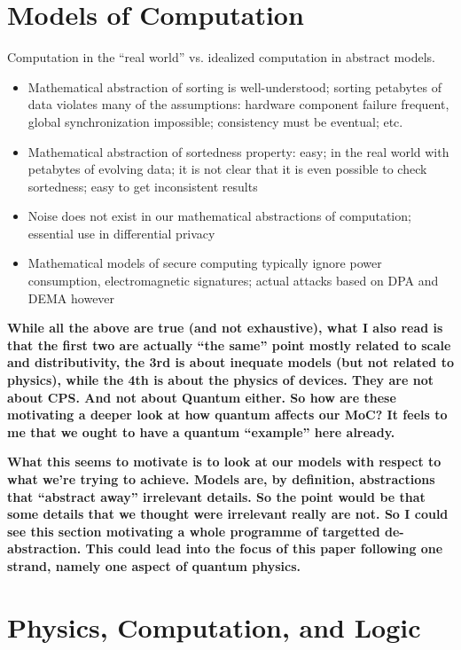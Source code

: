 \documentclass[12pt]{article}
\newcommand{\jc}[1]{\fbox{Jacques says:} \textbf{#1}}
\begin{document}
\section{Models of Computation}

Computation in the ``real world'' vs. idealized computation in
abstract models.
\begin{itemize}
\item Mathematical abstraction of sorting is well-understood; sorting
  petabytes of data violates many of the assumptions: hardware
  component failure frequent, global synchronization impossible;
  consistency must be eventual; etc.
\item Mathematical abstraction of sortedness property: easy; in the
  real world with petabytes of evolving data; it is not clear that it
  is even possible to check sortedness; easy to get inconsistent
  results
\item Noise does not exist in our mathematical abstractions of
  computation; essential use in differential privacy
\item Mathematical models of secure computing typically ignore power
  consumption, electromagnetic signatures; actual attacks based on DPA
  and DEMA however
\end{itemize}

\jc{While all the above are true (and not exhaustive), what I also read
is that the first two are actually ``the same'' point mostly related
to scale and distributivity, the 3rd is about inequate models (but not
related to physics), while the 4th is about the physics of devices.
They are not about CPS. And not about Quantum either. So how are these
motivating a deeper look at how quantum affects our MoC? It feels to me
that we ought to have a quantum ``example'' here already.}

\jc{What this seems to motivate is to look at our models with respect
to what we're trying to achieve.  Models are, by definition, abstractions
that ``abstract away'' irrelevant details. So the point would be that
some details that we thought were irrelevant really are not.
So I could see this section motivating a whole programme of
targetted de-abstraction. This could lead into the focus of this paper
following one strand, namely one aspect of quantum physics.}

\section{Physics, Computation, and Logic}
\end{document}
